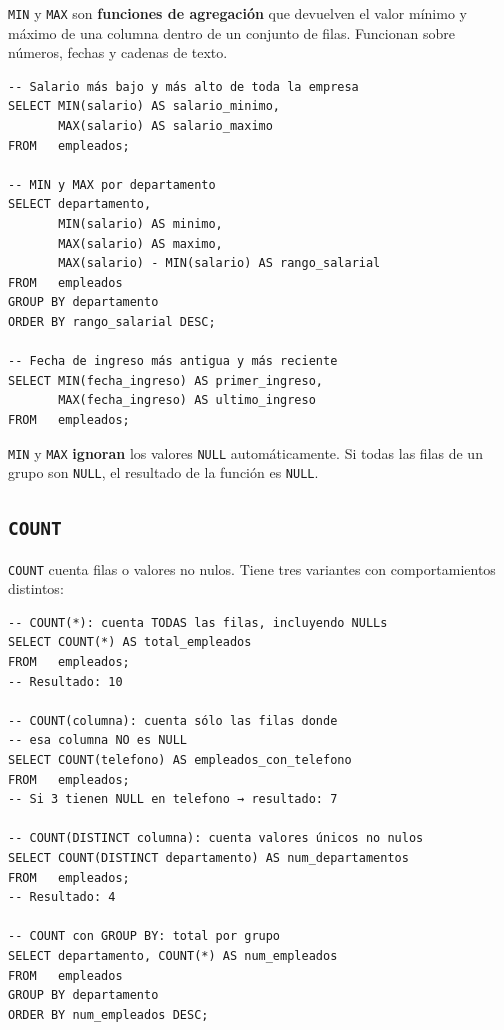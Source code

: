 \texttt{MIN} y \texttt{MAX} son \textbf{funciones de agregación}
que devuelven el valor mínimo y máximo de una columna dentro de
un conjunto de filas.
Funcionan sobre números, fechas y cadenas de texto.

\begin{lstlisting}[caption={MIN y MAX sobre números y fechas.}]
-- Salario más bajo y más alto de toda la empresa
SELECT MIN(salario) AS salario_minimo,
       MAX(salario) AS salario_maximo
FROM   empleados;

-- MIN y MAX por departamento
SELECT departamento,
       MIN(salario) AS minimo,
       MAX(salario) AS maximo,
       MAX(salario) - MIN(salario) AS rango_salarial
FROM   empleados
GROUP BY departamento
ORDER BY rango_salarial DESC;

-- Fecha de ingreso más antigua y más reciente
SELECT MIN(fecha_ingreso) AS primer_ingreso,
       MAX(fecha_ingreso) AS ultimo_ingreso
FROM   empleados;
\end{lstlisting}

\begin{nota}
\texttt{MIN} y \texttt{MAX} \textbf{ignoran} los valores
\texttt{NULL} automáticamente.
Si todas las filas de un grupo son \texttt{NULL}, el resultado
de la función es \texttt{NULL}.
\end{nota}

\subsection{\texttt{COUNT}}

\texttt{COUNT} cuenta filas o valores no nulos.
Tiene tres variantes con comportamientos distintos:

\begin{lstlisting}[caption={Variantes de COUNT.}]
-- COUNT(*): cuenta TODAS las filas, incluyendo NULLs
SELECT COUNT(*) AS total_empleados
FROM   empleados;
-- Resultado: 10

-- COUNT(columna): cuenta sólo las filas donde
-- esa columna NO es NULL
SELECT COUNT(telefono) AS empleados_con_telefono
FROM   empleados;
-- Si 3 tienen NULL en telefono → resultado: 7

-- COUNT(DISTINCT columna): cuenta valores únicos no nulos
SELECT COUNT(DISTINCT departamento) AS num_departamentos
FROM   empleados;
-- Resultado: 4

-- COUNT con GROUP BY: total por grupo
SELECT departamento, COUNT(*) AS num_empleados
FROM   empleados
GROUP BY departamento
ORDER BY num_empleados DESC;
\end{lstlisting}

